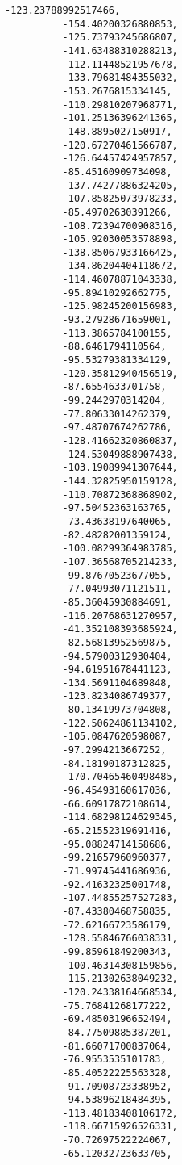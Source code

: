 \documentclass[11pt]{article}
\begin{document}
\begin{Verbatim}[commandchars=\\\{\}]
          -123.23788992517466,
          -154.40200326880853,
          -125.73793245686807,
          -141.63488310288213,
          -112.11448521957678,
          -133.79681484355032,
          -153.2676815334145,
          -110.29810207968771,
          -101.25136396241365,
          -148.8895027150917,
          -120.67270461566787,
          -126.64457424957857,
          -85.45160909734098,
          -137.74277886324205,
          -107.85825073978233,
          -85.49702630391266,
          -108.72394700908316,
          -105.92030053578898,
          -138.85067933166425,
          -134.86204404118672,
          -114.46078871043338,
          -95.89410292662775,
          -125.98245200156983,
          -93.27928671659001,
          -113.3865784100155,
          -88.6461794110564,
          -95.53279381334129,
          -120.35812940456519,
          -87.6554633701758,
          -99.2442970314204,
          -77.80633014262379,
          -97.48707674262786,
          -128.41662320860837,
          -124.53049888907438,
          -103.19089941307644,
          -144.32825950159128,
          -110.70872368868902,
          -97.50452363163765,
          -73.43638197640065,
          -82.48282001359124,
          -100.08299364983785,
          -107.36568705214233,
          -99.87670523677055,
          -77.04993071121511,
          -85.36045930884691,
          -116.20768631270957,
          -41.352108393685924,
          -82.56813952569875,
          -94.57900312930404,
          -94.61951678441123,
          -134.5691104689848,
          -123.8234086749377,
          -80.13419973704808,
          -122.50624861134102,
          -105.0847620598087,
          -97.2994213667252,
          -84.18190187312825,
          -170.70465460498485,
          -96.45493160617036,
          -66.60917872108614,
          -114.68298124629345,
          -65.21552319691416,
          -95.08824714158686,
          -99.21657960960377,
          -71.99745441686936,
          -92.41632325001748,
          -107.44855257527283,
          -87.43380468758835,
          -72.62166723586179,
          -128.55846766038331,
          -99.85961849200343,
          -100.46314308159856,
          -115.21302638049232,
          -120.24338164668534,
          -75.76841268177222,
          -69.48503196652494,
          -84.77509885387201,
          -81.66071700837064,
          -76.9553535101783,
          -85.40522225563328,
          -91.70908723338952,
          -94.53896218484395,
          -113.48183408106172,
          -118.66715926526331,
          -70.72697522224067,
          -65.12032723633705,

\end{Verbatim}
\end{document}

